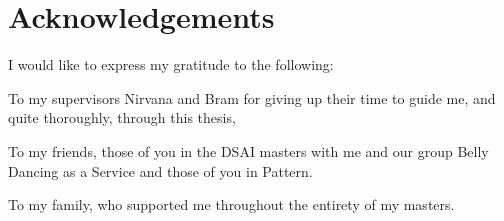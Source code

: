 \chapter*{Acknowledgements}\label{chapter:acknowledgements}

I would like to express my gratitude to the following:

To my supervisors Nirvana and Bram for giving up their time to guide me, and quite thoroughly, through this thesis,

To my friends, those of you in the DSAI masters with me and our group Belly Dancing as a Service and those of you in Pattern.

To my family, who supported me throughout the entirety of my masters.
